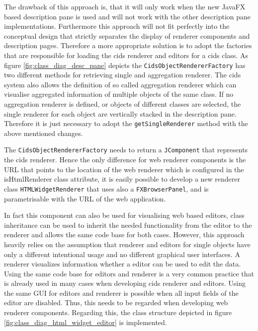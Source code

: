 
The drawback of this approach is, that it will only work when  the new JavaFX based description pane is used and will not work with the other description pane implementations.
Furthermore this approach will not fit perfectly into the conceptual design that strictly separates the display of renderer components and description pages.
Therefore a more appropriate solution is to adopt the factories that are responsible for loading the cids renderer and editors for a cids class.
As figure \ref{fig:class_diag_desc_pane} depicts the \texttt{CidsObjectRendererFactory} has two different methods for retrieving single and aggregation renderer.
The cids system also allows the definition of so called aggregation renderer which can visualise aggregated information of multiple objects of the same class.
If no aggregation renderer is defined, or objects of different classes are selected, the single renderer for each object are vertically stacked in the description pane.
Therefore it is just necessary to adopt the \texttt{getSingleRenderer} method with the above mentioned changes.

The \texttt{CidsObjectRendererFactory} needs to return a \texttt{JComponent} that represents the cids renderer.
Hence the only difference for web renderer components is the URL that  points to the location of the web renderer which is configured in the isHtmlRenderer  class attribute, it is easily possible to develop a new renderer class \texttt{HTMLWidgetRenderer} that uses also a \texttt{FXBrowserPanel}, and is parametrisable  with the URL of the web application.

In fact this component can also be used for visualising web based editors,  class inheritance can be used to inherit the needed functionality from the editor to the renderer and allows the same code base for both cases.
However, this approach heavily relies on the assumption that renderer and editors for single objects have only a different intentional usage and no different graphical user interfaces. 
A renderer visualizes  information whether a editor can be used to edit the data.
Using the same code base for editors and renderer is a very common practice that is  already used in many cases when developing cids renderer and editors.
Using the same GUI for editors and renderer is possible when all input fields of the editor are disabled.
Thus, this needs to be regarded when developing web renderer components.
Regarding this, the class structure depicted in figure  \ref{fig:class_diag_html_widget_editor} is implemented.

